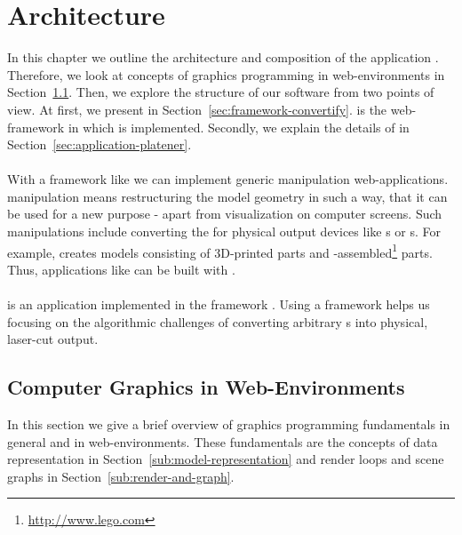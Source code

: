 \documentclass[../ClassicThesis.tex]{subfiles}
\begin{document}
\newcommand\myNotes[1]{\textcolor{red}{#1}}
\newcommand{\note}[1]{\myNotes{#1}}
\newcommand{\class}[1]{\emph{#1}}
\newcommand{\name}[1]{\texit{#1}}


\chapter{Architecture}
\label{ch:architecture}

In this chapter we outline the architecture and composition of the
application {\platener}. Therefore, we look at concepts of graphics
programming in web-environments in Section~\ref{sec:cg-web}. Then, we
explore the structure of our software from two points of view. At
first, we present {\convertify} in
Section~\ref{sec:framework-convertify}. {\convertify} is the
web-framework in which {\platener} is implemented. Secondly, we
explain the details of {\platener} in
Section~\ref{sec:application-platener}.\\
\\
With a framework like {\convertify} we can implement generic
{\threedmodel} manipulation web-applications. {\threedmodel}
manipulation means restructuring the model geometry in such a way,
that it can be used for a new purpose - apart from visualization on
computer screens. Such manipulations include converting the
{\threedmodel} for physical output devices like {\threedprinter}s or
{\lasercutter}s. For example, {\brickify} creates models consisting of
3D-printed parts and
{\lego}-assembled\footnote{\url{http://www.lego.com}} parts. Thus,
applications like
{\brickify} can be built with {\convertify}.\\
\\
{\platener} is an application implemented in the framework {\convertify}.
Using a framework helps us focusing on the algorithmic challenges of
converting arbitrary {\threedmodel}s into physical, laser-cut output.

\section{Computer Graphics in Web-Environments}
\label{sec:cg-web}

In this section we give a brief overview of graphics programming
fundamentals in general and in web-environments. These fundamentals
are the concepts of {\threedmodel} data representation in
Section~\ref{sub:model-representation} and render loops and scene
graphs in Section~\ref{sub:render-and-graph}.
\end{document}
